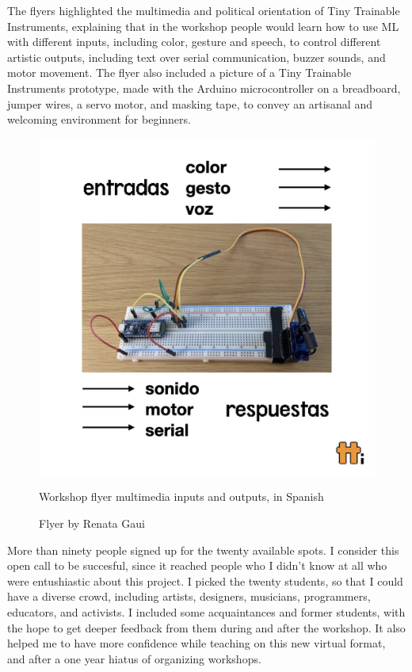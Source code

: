 The flyers highlighted the multimedia and political orientation of Tiny Trainable Instruments, explaining that in the workshop people would learn how to use \acrshort{ML} with different inputs, including color, gesture and speech, to control different artistic outputs, including text over serial communication, buzzer sounds, and motor movement. The flyer also included a picture of a Tiny Trainable Instruments prototype, made with the Arduino microcontroller on a breadboard, jumper wires, a servo motor, and masking tape, to convey an artisanal and welcoming environment for beginners.


\begin{figure}[ht]
  \centering
  \includegraphics[width=0.75\linewidth,height=0.35\textheight,keepaspectratio]{images/workshop-es-2.jpg}
  \caption{Workshop flyer multimedia inputs and outputs, in Spanish}
  \caption*{Flyer by Renata Gaui}
  \label{fig:workshop-spanish-flyer-page-2}
\end{figure}

More than ninety people signed up for the twenty available spots. I consider this open call to be succesful, since it reached people who I didn't know at all who were entushiastic about this project. I picked the twenty students, so that I could have a diverse crowd, including artists, designers, musicians, programmers, educators, and activists. I included some acquaintances and former students, with the hope to get deeper feedback from them during and after the workshop. It also helped me to have more confidence while teaching on this new virtual format, and after a one year hiatus of organizing workshops.

